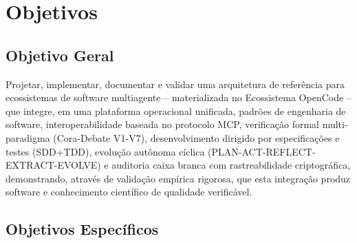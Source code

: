 \documentclass[12pt,a4paper,sumario=tradicional,openany]{abntex2}
\begin{document}
\section{Objetivos}

\subsection{Objetivo Geral}

Projetar, implementar, documentar e validar uma arquitetura de referência para ecossistemas de software multiagente -- materializada no Ecossistema OpenCode -- que integre, em uma plataforma operacional unificada, padrões de engenharia de software, interoperabilidade baseada no protocolo MCP, verificação formal multi-paradigma (Cora-Debate V1-V7), desenvolvimento dirigido por especificações e testes (SDD+TDD), evolução autônoma cíclica (PLAN-ACT-REFLECT-EXTRACT-EVOLVE) e auditoria caixa branca com rastreabilidade criptográfica, demonstrando, através de validação empírica rigorosa, que esta integração produz software e conhecimento científico de qualidade verificável.

\subsection{Objetivos Específicos}
\end{document}
